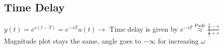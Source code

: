 \subsection{Time Delay}
    $y(t) = e^{s(t-T)} = e^{-sT} u(t) \rightarrow$ Time delay is given by $e^{-sT} \overset{\text{Padé}}{\approx} \frac{\frac{2}{T} - s}{\frac{2}{T} + s}$\\
    Magnitude plot stays the same, angle goes to $-\infty$ for increasing $\omega$